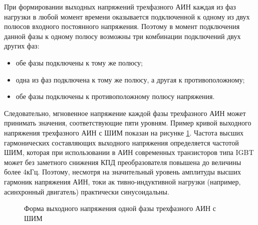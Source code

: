         При формировании выходных напряжений трехфазного АИН каждая из фаз
        нагрузки в любой момент времени оказывается подключенной к одному из
        двух полюсов входного постоянного напряжения. Поэтому в момент
        подключения данной фазы к одному полюсу возможны три комбинации
        подключений двух других фаз:
        \begin{itemize}
            \item обе фазы подключены к тому же полюсу;
            \item одна из фаз подключена к тому же полюсу, а другая к противоположному;
            \item обе фазы подключены к противоположному полюсу напряжения. 
        \end{itemize}

        Следовательно, мгновенное напряжение каждой фазы трехфазного АИН может
        принимать значения, соответствующие пяти уровням. Пример кривой
        выходного напряжения трехфазного АИН с ШИМ показан на рисунке
        \ref{fig:3ph-pwm}. Частота высших гармонических составляющих выходного
        напряжения определяется частотой ШИМ, которая при использовании в АИН
        современных транзисторов типа IGBT может без заметного снижения КПД
        преобразователя повышена до величины более 4кГц. Поэтому, несмотря на
        значительный уровень амплитуды высших гармоник напряжения АИН, токи ак
        тивно-индуктивной нагрузки (например, асинхронный двигатель)
        практически синусоидальны.

        \begin{figure}[h!]
            \caption{Форма выходного напряжения одной фазы трехфазного АИН с ШИМ}
            \label{fig:3ph-pwm}
        \end{figure}

